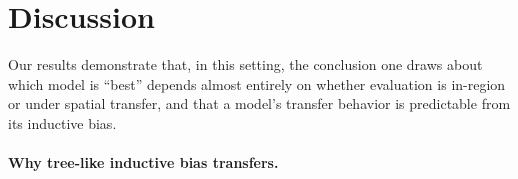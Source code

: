 \documentclass[pdflatex,sn-mathphys]{sn-jnl} %
\begin{document}
\section{Discussion}
\label{sec:discussion}

Our results demonstrate that, in this setting, the conclusion one draws about which
model is ``best'' depends almost entirely on whether evaluation is in-region or
under spatial transfer, and that a model's transfer behavior is predictable from
its inductive bias.

\paragraph{Why tree-like inductive bias transfers.}
\end{document}
